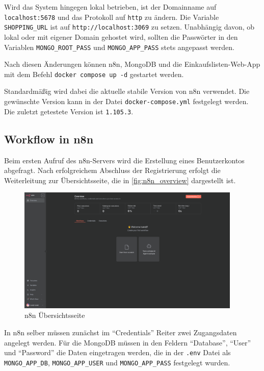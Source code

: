 Wird das System hingegen lokal betrieben, ist der Domainname auf \verb|localhost:5678| und das
Protokoll auf \verb|http| zu ändern. Die Variable \verb|SHOPPING_URL| ist auf
\verb|http://localhost:3069| zu setzen. Unabhängig davon, ob lokal oder mit eigener Domain gehostet
wird, sollten die Passwörter in den Variablen \verb|MONGO_ROOT_PASS| und \verb|MONGO_APP_PASS| stets
angepasst werden.

Nach diesen Änderungen können n8n, MongoDB und die Einkaufslisten-Web-App mit dem Befehl
\verb|docker compose up -d| gestartet werden.

Standardmäßig wird dabei die aktuelle stabile Version von n8n verwendet. Die gewünschte Version kann
in der Datei \verb|docker-compose.yml| festgelegt werden. Die zuletzt getestete Version ist
\verb|1.105.3|.

\subsection{Workflow in n8n}\label{sub:workflow_in_n_n} %
Beim ersten Aufruf des n8n-Servers wird die Erstellung eines Benutzerkontos abgefragt. Nach
erfolgreichem Abschluss der Registrierung erfolgt die Weiterleitung zur Übersichtsseite, die in
\autoref{fig:n8n_overview} dargestellt ist.

\begin{figure}
    \begin{center}
        \includegraphics[width=0.95\textwidth]{images/n8n_overview.png}
    \end{center}
    \caption{n8n Übersichtsseite}\label{fig:n8n_overview}
\end{figure}

In n8n selber müssen zunächst im \enquote{Credentials} Reiter zwei Zugangsdaten angelegt werden. Für
die MongoDB müssen in den Feldern \enquote{Database}, \enquote{User} und \enquote{Password} die Daten
eingetragen werden, die in der \verb|.env| Datei als \verb|MONGO_APP_DB|, \verb|MONGO_APP_USER| und
\verb|MONGO_APP_PASS| festgelegt wurden.

